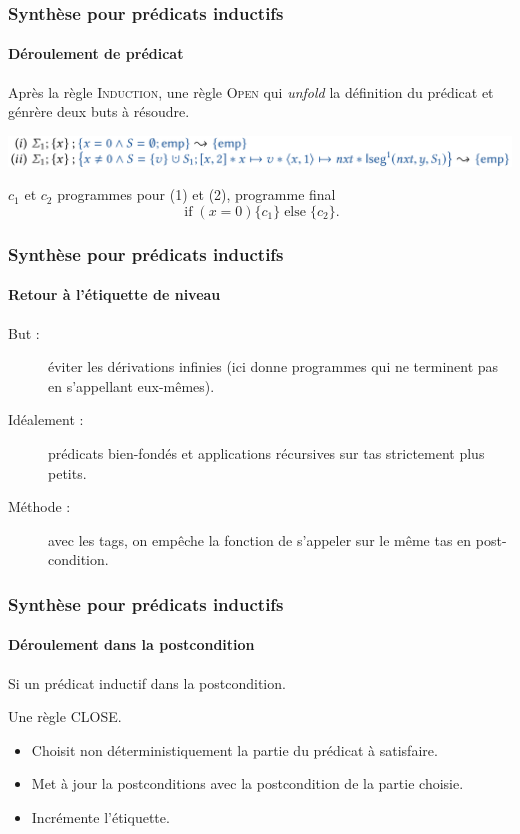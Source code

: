 \documentclass[french]{beamer}
\DeclareMathOperator{\If}{if}
\DeclareMathOperator{\Else}{else}
\begin{document}
\begin{frame}[fragile]
	\frametitle{Synthèse pour prédicats inductifs}
	\framesubtitle{Déroulement de prédicat}
   Après la règle \textsc{Induction}, une règle \textsc{Open} qui \textit{unfold}
   la définition du prédicat et génrère deux buts à résoudre.
        
   \includegraphics[width=\linewidth]{figures/unfold.png}
   
   $c_1$ et $c_2$ programmes pour (1) et (2), programme final
   \[
      \If (x = 0) \{c_1\} \Else \{ c_2 \}.
   \]
\end{frame}

\begin{frame}[fragile]
	\frametitle{Synthèse pour prédicats inductifs}
	\framesubtitle{Retour à l'étiquette de niveau}
   \begin{description}
      \item[But :] éviter les dérivations infinies (ici donne programmes qui ne terminent 
                   pas en s'appellant eux-mêmes).
      \item[Idéalement :] prédicats bien-fondés et applications récursives sur tas 
                       strictement plus petits.      
      \item[Méthode :] avec les tags, on empêche la fonction de s'appeler sur le même 
                       tas en post-condition.
   \end{description}
\end{frame}

\begin{frame}[fragile]
	\frametitle{Synthèse pour prédicats inductifs}
	\framesubtitle{Déroulement dans la postcondition}
      Si un prédicat inductif dans la postcondition.
      
      Une règle \textsc{CLOSE}.
      \begin{itemize}
         \item Choisit non déterministiquement la partie du prédicat à satisfaire.
         \item Met à jour la postconditions avec la postcondition de la partie choisie.
         \item Incrémente l'étiquette.
      \end{itemize}
\end{frame}
\end{document}

